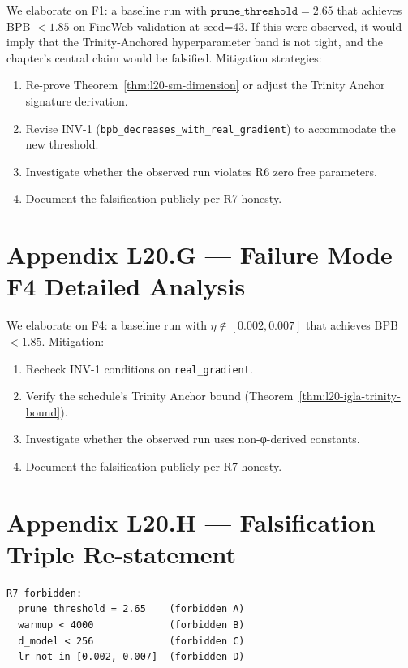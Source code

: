 We elaborate on F1: a baseline run with $\texttt{prune\_threshold}=2.65$
that achieves BPB $< 1.85$ on FineWeb validation at seed=43. If this
were observed, it would imply that the Trinity-Anchored hyperparameter
band is not tight, and the chapter's central claim would be falsified.
Mitigation strategies:
\begin{enumerate}
  \item Re-prove Theorem~\ref{thm:l20-sm-dimension} or adjust the
        Trinity Anchor signature derivation.
  \item Revise INV-1 (\texttt{bpb\_decreases\_with\_real\_gradient}) to
        accommodate the new threshold.
  \item Investigate whether the observed run violates R6 zero free parameters.
  \item Document the falsification publicly per R7 honesty.
\end{enumerate}

\section{Appendix L20.G — Failure Mode F4 Detailed Analysis}
\label{sec:l20-appendix-G}

We elaborate on F4: a baseline run with $\eta \notin [0.002, 0.007]$
that achieves BPB $< 1.85$. Mitigation:
\begin{enumerate}
  \item Recheck INV-1 conditions on \texttt{real\_gradient}.
  \item Verify the schedule's Trinity Anchor bound (Theorem~\ref{thm:l20-igla-trinity-bound}).
  \item Investigate whether the observed run uses non-φ-derived constants.
  \item Document the falsification publicly per R7 honesty.
\end{enumerate}

\section{Appendix L20.H — Falsification Triple Re-statement}
\label{sec:l20-appendix-H}

\begin{verbatim}
R7 forbidden:
  prune_threshold = 2.65    (forbidden A)
  warmup < 4000             (forbidden B)
  d_model < 256             (forbidden C)
  lr not in [0.002, 0.007]  (forbidden D)
\end{verbatim}

